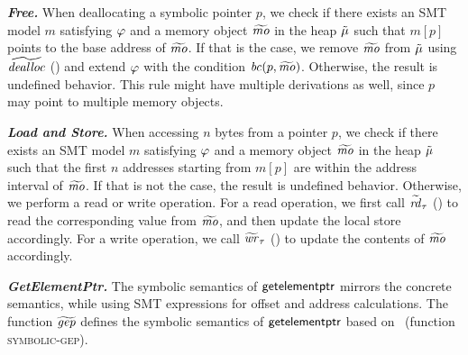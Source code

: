 \textbf{\textit{Free.}}
When deallocating a symbolic pointer $p$,
we check if there exists an SMT model $m$ satisfying $\varphi$ and a memory object $\widetilde{\mathit{mo}}$ in the heap $\tilde{\mu}$ such that $m[p]$ points to the base address of $\widetilde{\mathit{mo}}$.
If that is the case, we remove $\widetilde{\mathit{mo}}$ from $\tilde{\mu}$ using $\widetilde{\mathit{dealloc}}$ () and extend $\varphi$ with the condition $\mathit{bc}(p, \widetilde{\mathit{mo}})$.
Otherwise, the result is undefined behavior.
This rule might have multiple derivations as well, since $p$ may point to multiple memory objects.

\textbf{\textit{Load and Store.}}
When accessing $n$ bytes from a pointer $p$,
we check if there exists an SMT model $m$ satisfying $\varphi$ and a memory object $\widetilde{\mathit{mo}}$ in the heap $\tilde{\mu}$ such that the first $n$ addresses starting from $m[p]$ are within the address interval of $\widetilde{\mathit{mo}}$.
If that is not the case, the result is undefined behavior.
Otherwise, we perform a read or write operation.
For a read operation,
we first call $\widetilde{\mathit{rd}}_{\tau}$ () to read the corresponding value from $\widetilde{\mathit{mo}}$,
and then update the local store accordingly.
For a write operation,
we call $\widetilde{\mathit{wr}}_{\tau}$ () to update the contents of $\widetilde{\mathit{mo}}$ accordingly.

\textbf{\textit{GetElementPtr.}}
The symbolic semantics of $\textsf{getelementptr}$ mirrors the concrete semantics,
while using SMT expressions for offset and address calculations.
The function $\widetilde{\mathit{gep}}$ defines the symbolic semantics of $\textsf{getelementptr}$ based on~ (function \textsc{symbolic-gep}).

%
%
%

